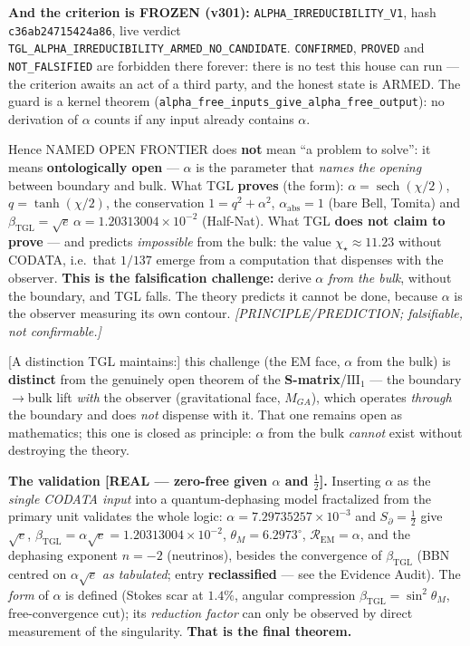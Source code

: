 \documentclass[11pt]{article}
\newcommand{\bTGL}{\beta_{\mathrm{TGL}}}\newcommand{\Msun}{M_{\odot}}\newcommand{\TGL}{\mathrm{TGL}}
\theoremstyle{definition}\newtheorem{deriv}{Derivation}
\begin{document}
\textbf{And the criterion is FROZEN (v301):} \texttt{ALPHA\_IRREDUCIBILITY\_V1}, hash \texttt{c36ab24715424a86}, live verdict \texttt{TGL\_ALPHA\_IRREDUCIBILITY\_ARMED\_NO\_CANDIDATE}. \texttt{CONFIRMED}, \texttt{PROVED} and \texttt{NOT\_FALSIFIED} are forbidden there forever: there is no test this house can run --- the criterion awaits an act of a third party, and the honest state is ARMED. The guard is a kernel theorem (\texttt{alpha\_free\_inputs\_give\_alpha\_free\_output}): no derivation of $\alpha$ counts if any input already contains $\alpha$.

Hence \textsf{NAMED OPEN FRONTIER} does \textbf{not} mean ``a problem to solve'': it means \textbf{ontologically open} --- $\alpha$ is the parameter that \emph{names the opening} between boundary and bulk. What TGL \textbf{proves} (the form): $\alpha=\operatorname{sech}(\chi/2)$, $q=\tanh(\chi/2)$, the conservation $1=q^2+\alpha^2$, $\alpha_{\mathrm{abs}}=1$ (bare Bell, Tomita) and $\bTGL=\sqrt e\,\alpha=1.20313004\times10^{-2}$ (Half-Nat). What TGL \textbf{does not claim to prove} --- and predicts \emph{impossible} from the bulk: the value $\chi_\star\approx11.23$ without CODATA, i.e.\ that $1/137$ emerge from a computation that dispenses with the observer. \textbf{This is the falsification challenge:} derive $\alpha$ \emph{from the bulk}, without the boundary, and TGL falls. The theory predicts it cannot be done, because $\alpha$ is the observer measuring its own contour. \emph{[PRINCIPLE/PREDICTION; falsifiable, not confirmable.]}

\textsf{[A distinction TGL maintains:]} this challenge (the EM face, $\alpha$ from the bulk) is \textbf{distinct} from the genuinely open theorem of the \textbf{S-matrix}/$\mathrm{III}_1$ --- the boundary$\to$bulk lift \emph{with} the observer (gravitational face, $M_{GA}$), which operates \emph{through} the boundary and does \emph{not} dispense with it. That one remains open as mathematics; this one is closed as principle: $\alpha$ from the bulk \emph{cannot} exist without destroying the theory.

\textbf{The validation \textsf{[REAL --- zero-free given $\alpha$ and $\tfrac12$]}.} Inserting $\alpha$ as the \emph{single CODATA input} into a quantum-dephasing model fractalized from the primary unit validates the whole logic: $\alpha=7.29735257\times10^{-3}$ and $S_\partial=\tfrac12$ give $\sqrt e$, $\bTGL=\alpha\sqrt e=1.20313004\times10^{-2}$, $\theta_M=6.2973^\circ$, $\mathcal{R}_{\mathrm{EM}}=\alpha$, and the dephasing exponent $n=-2$ (neutrinos), besides the convergence of $\bTGL$ (BBN centred on $\alpha\sqrt e$ \emph{as tabulated}; entry \textbf{reclassified} --- see the Evidence Audit). The \emph{form} of $\alpha$ is defined (Stokes scar at $1.4\%$, angular compression $\bTGL=\sin^2\theta_M$, free-convergence cut); its \emph{reduction factor} can only be observed by direct measurement of the singularity. \textbf{That is the final theorem.}
\end{document}
